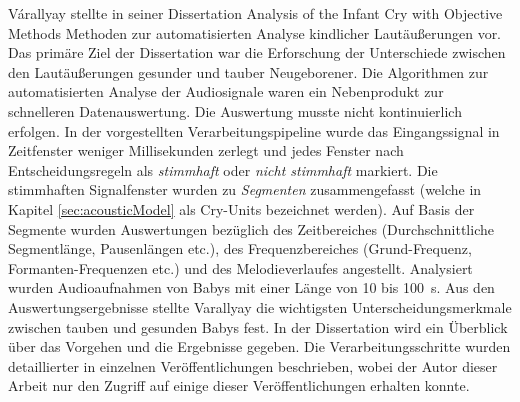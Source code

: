 Várallyay stellte in seiner Dissertation \glqq Analysis of the Infant Cry with Objective Methods\grqq{} \cite{cry_thesis} Methoden zur automatisierten Analyse kindlicher Lautäußerungen vor. Das primäre Ziel der Dissertation war die Erforschung der Unterschiede zwischen den Lautäußerungen gesunder und tauber Neugeborener. Die Algorithmen zur automatisierten Analyse der Audiosignale waren ein \glqq Nebenprodukt\grqq{} zur schnelleren Datenauswertung. Die Auswertung musste nicht kontinuierlich erfolgen. In der vorgestellten Verarbeitungspipeline wurde das Eingangssignal in Zeitfenster weniger Millisekunden zerlegt und jedes Fenster nach Entscheidungsregeln als \emph{stimmhaft} oder \emph{nicht stimmhaft} markiert. Die stimmhaften Signalfenster wurden zu \emph{Segmenten} zusammengefasst (welche in Kapitel \ref{sec:acousticModel} als Cry-Units bezeichnet werden). Auf Basis der Segmente wurden Auswertungen bezüglich des Zeitbereiches (Durchschnittliche Segmentlänge, Pausenlängen etc.), des Frequenzbereiches (Grund-Frequenz, Formanten-Frequenzen etc.) und des Melodieverlaufes angestellt. Analysiert wurden Audioaufnahmen von Babys mit einer Länge von 10 bis \SI{100}{\second}. Aus den Auswertungsergebnisse stellte Varallyay die wichtigsten Unterscheidungsmerkmale zwischen tauben und gesunden Babys fest. In der Dissertation \cite{cry_thesis} wird ein Überblick über das Vorgehen und die Ergebnisse gegeben. Die Verarbeitungsschritte wurden detaillierter in einzelnen Veröffentlichungen beschrieben, wobei der Autor dieser Arbeit nur den Zugriff auf einige dieser Veröffentlichungen erhalten konnte.

